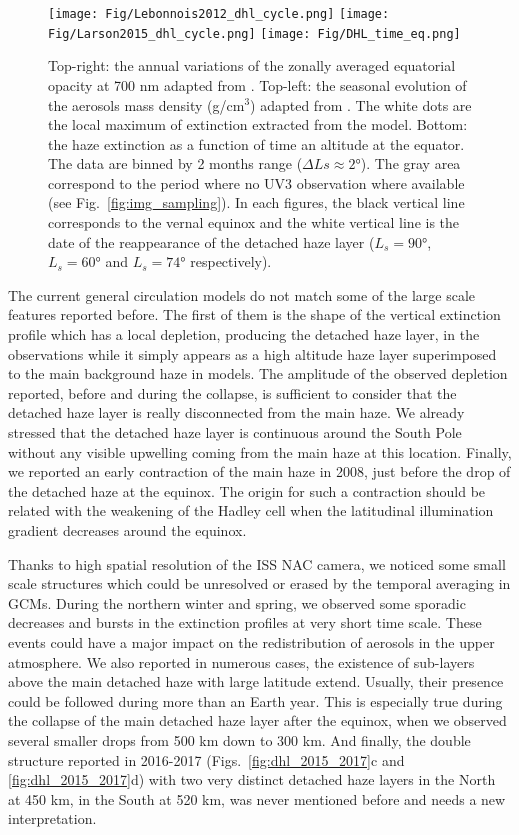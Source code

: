 \begin{figure}[!ht]
    \centering
    \texttt{[image: Fig/Lebonnois2012\_dhl\_cycle.png]}
    \texttt{[image: Fig/Larson2015\_dhl\_cycle.png]}
    \texttt{[image: Fig/DHL\_time\_eq.png]}
    \caption{Top-right: the annual variations of the zonally averaged equatorial opacity at 700 nm adapted
        from \cite{Lebonnois2012}.
        Top-left: the seasonal evolution of the aerosols mass density (g/cm$^3$) adapted from \cite{Larson2015}. The white dots are the local maximum of extinction extracted from the model.
        Bottom: the haze extinction as a function of time an altitude at the equator. The data are binned
        by 2 months range ($\Delta Ls \approx \ang{2} $). The gray area correspond to the period where
        no UV3 observation where available (see Fig.~\ref{fig:img_sampling}).
        In each figures, the black vertical line corresponds to the vernal equinox and the white vertical
        line is the date of the reappearance of the detached haze layer ($L_s = \ang{90}$, $L_s = \ang{60}$
        and $L_s = \ang{74}$ respectively).
    }
    \label{fig:gcm_cycle}
\end{figure}

The current general circulation models do not match some of the large scale features reported before. The first of them
is the shape of the vertical extinction profile which has a local depletion, producing the detached haze layer, in the
observations while it simply appears as a high altitude haze layer superimposed to the main background haze in models.
The amplitude of the observed depletion reported, before and during the collapse, is sufficient to consider that the
detached haze layer is really disconnected from the main haze. We already stressed that the detached haze layer is
continuous around the South Pole without any visible upwelling coming from the main haze at this location. Finally, we
reported an early contraction of the main haze in 2008, just before the drop of the detached haze at the equinox. The origin
for such a contraction should be related with the weakening of the Hadley cell when the latitudinal illumination gradient
decreases around the equinox.

Thanks to high spatial resolution of the ISS NAC camera, we noticed some small scale structures which could be unresolved or
erased by the temporal averaging in GCMs. During the northern winter and spring, we observed some sporadic decreases and
bursts in the extinction profiles at very short time scale. These events could have a major impact on the redistribution of
aerosols in the upper atmosphere. We also reported in numerous cases, the existence of sub-layers above the main detached
haze with large latitude extend. Usually, their presence could be followed during more than an Earth year. This is
especially true during the collapse of the main detached haze layer after the equinox, when we observed several smaller
drops from 500 km down to 300 km. And finally, the double structure reported in 2016-2017
(Figs.~\ref{fig:dhl_2015_2017}c and \ref{fig:dhl_2015_2017}d) with two very distinct detached haze layers in the
North at 450 km, in the South at 520 km, was never mentioned before and needs a new interpretation.
